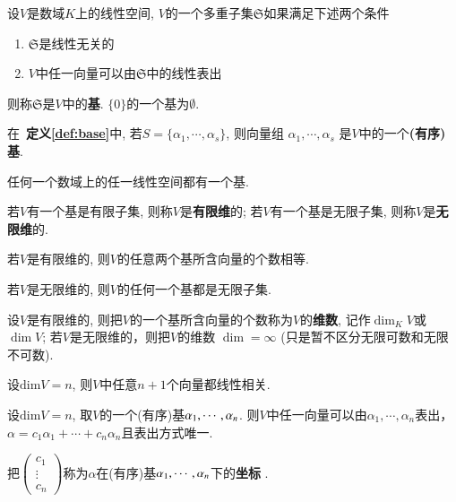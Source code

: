 \begin{Definition}[!!, 基] \label{def:base}
设$V$是数域$K$上的线性空间, $V$的一个多重子集$\mathfrak{S}$如果满足下述两个条件
\begin{enumerate}[(1)]
	\item $\mathfrak{S}$是线性无关的
	\item $V$中任一向量可以由$\mathfrak{S}$中的\;\;线性表出
\end{enumerate}
则称$\mathfrak{S}$是$V$中的\;\;\textbf{基}. $\{ 0 \}$的一个基\;\;为$\emptyset$.
\end{Definition}

\begin{Definition}[有序基]
在~\textbf{定义\ref{def:base}}中, 若$S = \{ \alpha_1, \cdots, \alpha_s \}$, 
则向量组 $\alpha_1, \cdots, \alpha_s$
是$V$中的一个\textbf{(有序)基}.
\end{Definition}


\begin{Theorem}[！依赖选择公理]
任何一个数域上的任一线性空间都有一个基.
\end{Theorem}

\begin{Definition}
若$V$有一个基是有限子集, 则称$V$是\textbf{有限维}的; 若$V$有一个基是无限子集, 则称$V$是\textbf{无限维}的. 
\end{Definition}

\begin{Theorem}
若$V$是有限维的, 则$V$的任意两个基所含向量的个数相等.
\end{Theorem}

\begin{Corollary}
若$V$是无限维的, 则$V$的任何一个基都是无限子集.
\end{Corollary}

\begin{Definition}[!!!, 维数]
设$V$是有限维的, 则把$V$的一个基所含向量的个数称为$V$的\textbf{维数}, 记作${\dim}_K V$或$\dim V$;
若$V$是无限维的，则把$V$的维数 $\dim = \infty$ (只是暂不区分无限可数和无限不可数).%
\end{Definition}

\begin{Proposition}[!]
设$\text{dim}V = n$, 则$V$中任意$n+1$个向量都线性相关.
\end{Proposition}

\begin{Definition}[坐标]
设$\text{dim}V = n$, 取$V$的一个(有序)基$\alpha_{1}, \cdots, \alpha_{n}$.
则$V$中任一向量可以由$\alpha_1, \cdots, \alpha_n$表出，$\alpha = c_1 \alpha_1 + \cdots + c_n \alpha_n$且表出方式唯一. 
\begin{tightcenter}
把$\begin{pmatrix} c_1 \\ \vdots \\ c_n \end{pmatrix}$称为$\alpha$在(有序)基$\alpha_{1}, \cdots, \alpha_{n}$下的\textbf{坐标} .
\end{tightcenter}
\end{Definition}

